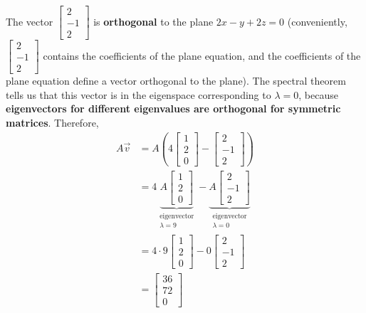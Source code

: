 \documentclass[11pt]{article}
\begin{document}
\begin{prob}[(11 pts)]
\begin{subprob}
\begin{solution}
The vector $\begin{bmatrix}2\\-1\\2\end{bmatrix}$ is \textbf{orthogonal} to the plane $2x-y+2z=0$ (conveniently, $\begin{bmatrix} 2 \\ -1 \\ 2 \end{bmatrix}$ contains the coefficients of the plane equation, and the coefficients of the plane equation define a vector orthogonal to the plane). The spectral theorem tells us that this vector is in the eigenspace corresponding to $\lambda=0$, because \textbf{eigenvectors for different eigenvalues are orthogonal for symmetric matrices}. Therefore,
\begin{align*}
A\vec{v}
&=
A\left(4\begin{bmatrix}1\\2\\0\end{bmatrix}
-\begin{bmatrix}2\\-1\\2\end{bmatrix}\right) \\
&=
4\underbrace{A\begin{bmatrix}1\\2\\0\end{bmatrix}}_{\substack{\text{eigenvector} \\ \lambda = 9}}
- \underbrace{A\begin{bmatrix}2\\-1\\2\end{bmatrix}}_{\substack{\text{eigenvector} \\ \lambda = 0}} \\
&=
4\cdot 9\begin{bmatrix}1\\2\\0\end{bmatrix}
- 0\begin{bmatrix}2\\-1\\2\end{bmatrix} \\
&=
\begin{bmatrix}36\\72\\0\end{bmatrix}
\end{align*}
\end{solution}
\end{subprob}
\end{prob}
\end{document}
